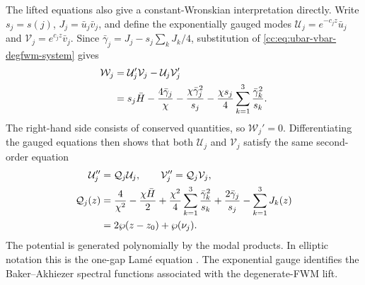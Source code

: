 \documentclass[11pt,a4paper]{article}
\begin{document}
The lifted equations also give a constant-Wronskian interpretation directly.
Write $s_j=s(j)$, $J_j=\bar u_j\bar v_j$, and define the exponentially gauged modes $\mathcal U_j=e^{-c_jz}\bar u_j$ and $\mathcal V_j=e^{c_jz}\bar v_j$.
Since $\bar\gamma_j=J_j-s_j\sum_kJ_k/4$, substitution of \eqref{cc:eq:ubar-vbar-degfwm-system} gives
\begin{align}
\mathcal W_j&=\mathcal U_j'\mathcal V_j-\mathcal U_j\mathcal V_j'\notag\\
&=s_j\bar H-\frac{4\bar\gamma_j}{\chi}
-\frac{\chi\bar\gamma_j^2}{s_j}
-\frac{\chi s_j}{4}\sum_{k=1}^3\frac{\bar\gamma_k^2}{s_k}.
\label{cc:eq:lifted-wronskian}
\end{align}
The right-hand side consists of conserved quantities, so $\mathcal W_j'=0$.
Differentiating the gauged equations then shows that both $\mathcal U_j$ and $\mathcal V_j$ satisfy the same second-order equation
\begin{align}
\mathcal U_j''&=\mathcal Q_j\mathcal U_j,\qquad
\mathcal V_j''=\mathcal Q_j\mathcal V_j,\notag\\
\mathcal Q_j(z)&=\frac{4}{\chi^2}-\frac{\chi\bar H}{2}
+\frac{\chi^2}{4}\sum_{k=1}^3\frac{\bar\gamma_k^2}{s_k}
+\frac{2\bar\gamma_j}{s_j}-\sum_{k=1}^3J_k(z)\notag\\
&=2\wp(z-z_0)+\wp(\nu_j).
\label{cc:eq:lifted-lame}
\end{align}
The potential is generated polynomially by the modal products.
In elliptic notation this is the one-gap Lam\'e equation \cite[Eq.~(1.9)]{kricheverEllipticSolutionsNonlinear1994}.
The exponential gauge identifies the Baker--Akhiezer spectral functions associated with the degenerate-FWM lift.
\end{document}
